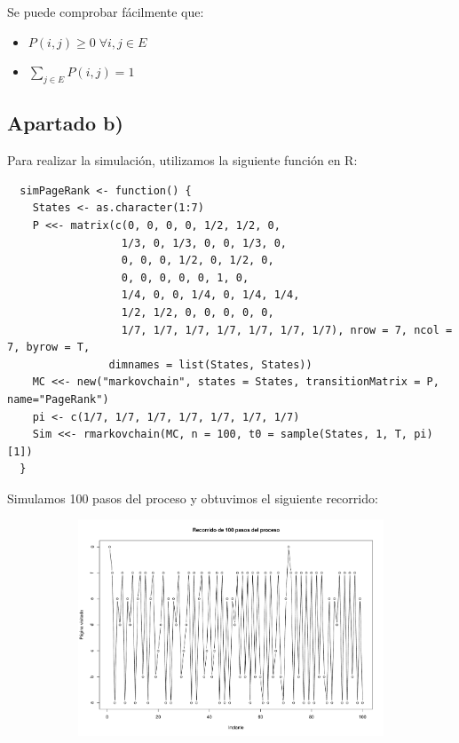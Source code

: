 \documentclass[11pt]{article}
\begin{document}
Se puede comprobar fácilmente que:
\begin{itemize}
  \item $P(i,j) \geq 0 \; \forall i,j \in E$
  \item $\displaystyle\sum_{j \in E} P(i,j) = 1$
\end{itemize}


\newpage
\subsection*{Apartado b)}

Para realizar la simulación, utilizamos la siguiente función en R:
\begin{verbatim}
  simPageRank <- function() {
    States <- as.character(1:7)
    P <<- matrix(c(0, 0, 0, 0, 1/2, 1/2, 0, 
                  1/3, 0, 1/3, 0, 0, 1/3, 0,
                  0, 0, 0, 1/2, 0, 1/2, 0,
                  0, 0, 0, 0, 0, 1, 0,
                  1/4, 0, 0, 1/4, 0, 1/4, 1/4,
                  1/2, 1/2, 0, 0, 0, 0, 0,
                  1/7, 1/7, 1/7, 1/7, 1/7, 1/7, 1/7), nrow = 7, ncol = 7, byrow = T,
                dimnames = list(States, States))
    MC <<- new("markovchain", states = States, transitionMatrix = P, name="PageRank")
    pi <- c(1/7, 1/7, 1/7, 1/7, 1/7, 1/7, 1/7)
    Sim <<- rmarkovchain(MC, n = 100, t0 = sample(States, 1, T, pi)[1])
  }
\end{verbatim}

Simulamos 100 pasos del proceso y obtuvimos el siguiente recorrido:

\begin{figure}[h!]
  \begin{center}
    \begin{subfigure}[b]{\linewidth}
      \includegraphics[width=\linewidth]{recorridoPageRank.pdf}
    \end{subfigure}
  \end{center}
\end{figure}
\end{document}
